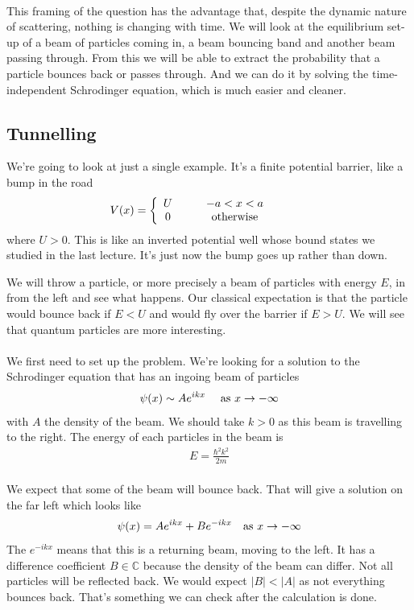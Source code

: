 \documentclass[12pt]{article}
\def\be{\begin{eqnarray}}
\def\ee{\end{eqnarray}}
\newcommand{\nn}{\nonumber}
\newcommand\para{\paragraph{}}
\newcommand{\co}{\color{olive}}
\newcommand{\C}{{\mathds C}}
\begin{document}
\para
This framing of the question has the advantage that, despite the dynamic nature of scattering, nothing is changing with time. We will look at the equilibrium set-up of a beam of particles coming in, a beam bouncing band and another beam passing through. From this we will be able to extract the probability that a particle bounces back or passes through. And we can do it by solving the time-independent Schrodinger equation, which is much easier and cleaner.
 
 

\subsection{Tunnelling}

{\co We're going to look at just a single example. It's a finite potential barrier, like a bump in the road
%
\be V(x) = \left\{\begin{array}{cc} U\ \ \ &\ \ \ -a<x<a\\ 0 \ \ \ & \ \ \ {\rm otherwise}\end{array}\right.\ \  \ \ \ \  \ \ \ \  \ee
%
where $U>0$.} This is like an inverted potential well whose bound states we studied in the last lecture. It's just now the bump goes up rather than down.


We will throw a particle, or more precisely a beam of particles with energy $E$, in from the left and see what happens. Our classical expectation is that the particle would bounce back if $E<U$ and would fly over the barrier if $E>U$. We will see that quantum particles are more interesting. 

\para
We first need to  set up the problem. {\co We're looking for a solution to the Schrodinger equation that has an ingoing beam of particles
%
\be \psi(x) \sim A e^{ikx}\ \ \ \ {\rm as}\ x\rightarrow -\infty\nn\ee
%
with $A$ the density of the beam. We should take $k>0$ as this beam is travelling to the right. The  energy of each particles in the beam is
%
\be E = \frac{\hbar^2k^2}{2m}\nn\ee
%
}

\para
{\co We expect that some of the beam will bounce back. That will give a solution on the far left which looks like
%
\be \psi(x) = Ae^{ikx} + Be^{-ikx}\ \ \ {\rm as}\ x\rightarrow -\infty\nn\ee
%
The $e^{-ikx}$ means that this is a returning beam, moving to the left. It has a difference coefficient $B\in \C$ because the density of the beam can differ. } Not all particles will be reflected back. {\co We would expect $|B|<|A|$ as not everything bounces back.} That's something we can check after the calculation is done. 
\end{document}
